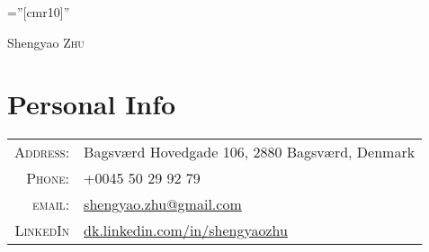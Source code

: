 \documentclass[a4paper,10pt]{article}
\begin{document}

\pagestyle{empty} %

\font\fb=''[cmr10]'' %

\par{\centering
		{\Huge Shengyao \textsc{Zhu}
	}\bigskip\par}




\section{Personal Info}

\begin{tabular}{rl}
    \textsc{Address:}   & Bagsværd Hovedgade 106, 2880 Bagsværd, Denmark \\
    \textsc{Phone:}     & +0045 50 29 92 79\\
    \textsc{email:}     & \href{mailto:shengyao.zhu@gmail.com}{shengyao.zhu@gmail.com} \\
    \textsc{LinkedIn}  &  \url{dk.linkedin.com/in/shengyaozhu}
\end{tabular}




\end{document}
